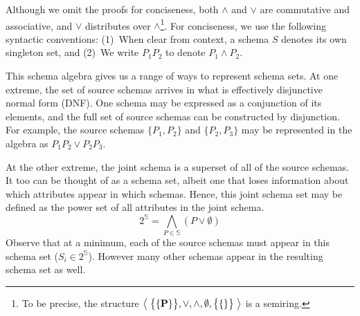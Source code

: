 Although we omit the proofs for conciseness, both $\wedge$ and $\vee$ are commutative and associative, and $\vee$ distributes over $\wedge$\footnote{To be precise, the structure $\left<\;{\big\{\{\mathbf P\}\big\}, \vee, \wedge, \emptyset, \big\{\{\}\big\}}\;\right>$ is a semiring.}.
For conciseness, we use the following syntactic conventions:
(1)~When clear from context, a schema $S$ denotes its own singleton set, and (2)~We write $P_1P_2$ to denote $P_1 \wedge P_2$.

This schema algebra gives us a range of ways to represent schema sets.
At one extreme, the set of source schemas arrives in what is effectively disjunctive normal form (DNF).
One schema may be expressed as a conjunction of its elements, and the full set of source schemas can be constructed by disjunction.
For example, the source schemas $\{P_1, P_2\}$ and $\{P_2, P_3\}$ may be represented in the algebra as $P_1P_2 \vee P_2P_3$.

At the other extreme, the joint schema is a superset of all of the source schemas.
It too can be thought of as a schema set, albeit one that loses information about which attributes appear in which schemas.
Hence, this joint schema set may be defined as the power set of all attributes in the joint schema.
$$2^{\mathbb S} = \bigwedge_{P \in \mathbb S} (P \vee \emptyset)$$
Observe that at a minimum, each of the source schemas must appear in this schema set ($S_i \in 2^{\mathbb S}$).
However many other schemas appear in the resulting schema set as well.


